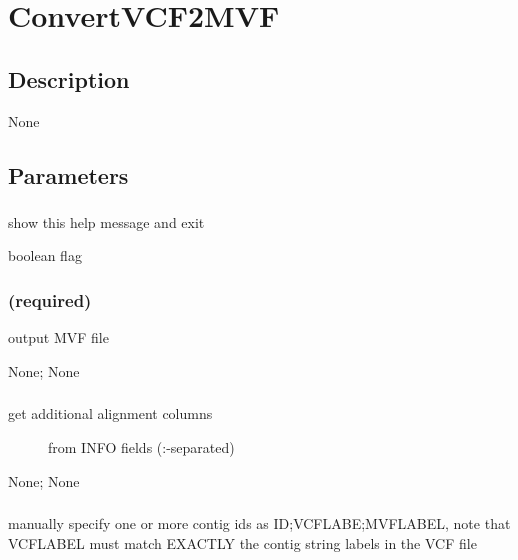 \documentclass[letterpaper,11pt,english]{sphinxmanual}
\begin{document}
\section{ConvertVCF2MVF}
\label{\detokenize{prog_desc:convertvcf2mvf}}

\subsection{Description}
\label{\detokenize{prog_desc:id31}}
None


\subsection{Parameters}
\label{\detokenize{prog_desc:id32}}

\subsubsection{}
\label{\detokenize{prog_desc:id33}}
 show this help message and exit

 boolean flag


\subsubsection{ (required)}
\label{\detokenize{prog_desc:id34}}
 output MVF file

 None;  None


\subsubsection{}
\label{\detokenize{prog_desc:alleles-from-allelesfrom}}\begin{description}
\item[{ get additional alignment columns}] \leavevmode
from INFO fields (:-separated)

\end{description}

 None;  None


\subsubsection{}
\label{\detokenize{prog_desc:id35}}
 manually specify one or more contig ids as ID;VCFLABE;MVFLABEL, note that VCFLABEL must match EXACTLY the contig string labels in the VCF file
\end{document}
